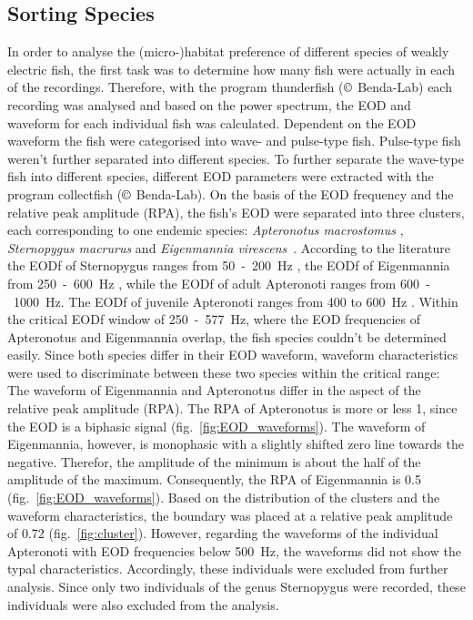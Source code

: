 \subsection{Sorting Species}
In order to analyse the (micro-)habitat preference of different species of weakly electric fish, the first task was to determine how many fish were actually in each of  the recordings. Therefore, with the program thunderfish ($\copyright$ Benda-Lab) each recording was analysed and based on the power spectrum, the EOD and waveform for each individual fish was calculated.
Dependent on the EOD waveform the fish were categorised into wave- and pulse-type fish. Pulse-type fish weren't further separated into different species. To further separate the wave-type fish into different species, different EOD parameters were extracted with the program collectfish ($\copyright$ Benda-Lab). On the basis of the EOD frequency and the relative peak amplitude (RPA), the fish's EOD were separated into three clusters, each corresponding to one endemic species: \textit{Apteronotus macrostomus} \citep{Santana2013}, \textit{Sternopygus macrurus} \citep{Keller1991} and \textit{Eigenmannia virescens}~\citep{silva2009cytogenetic}. According to the literature the EODf of Sternopygus ranges from 50~-~200~Hz \citep{Keller1991}, the EODf of Eigenmannia from 250~-~600~Hz \citep{Hopkins_74}, while the EODf of adult Apteronoti ranges from 600~-~1000~Hz. The EODf of juvenile Apteronoti ranges from 400 to 600~Hz \citep{Meyer1987}.
Within the critical EODf window of 250~-~577~Hz, where the EOD frequencies of Apteronotus and Eigenmannia overlap, the fish species couldn't be determined easily. Since both species differ in their EOD waveform, waveform characteristics were used to discriminate between these two species within the critical range: The waveform of Eigenmannia and Apteronotus differ in the aspect of the relative peak amplitude (RPA). The RPA of Apteronotus is more or less 1, since the EOD is a biphasic signal \citep{Zupanc_Bullock_2005} (fig.~\ref{fig:EOD_waveforms}). The waveform of Eigenmannia, however, is monophasic \citep{Zupanc_Bullock_2005} with a slightly shifted zero line towards the negative. Therefor, the amplitude of the minimum is about the half of the amplitude of the maximum. Consequently, the RPA of Eigenmannia is 0.5 (fig.~\ref{fig:EOD_waveforms}). Based on the distribution of the clusters and the waveform characteristics, the boundary was placed at a relative peak amplitude of 0.72 (fig.~\ref{fig:cluster}). However, regarding the waveforms of the individual Apteronoti with EOD frequencies below 500~Hz, the waveforms did not show the typal characteristics. Accordingly, these individuals were excluded from further analysis. Since only two individuals of the genus Sternopygus were recorded, these individuals were also excluded from the analysis.

